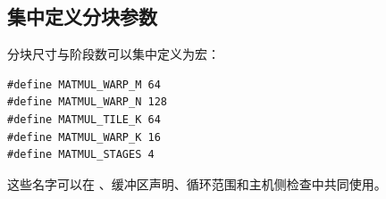 \subsection*{集中定义分块参数}

分块尺寸与阶段数可以集中定义为宏：

\begin{lstlisting}[language=croqtile,caption={用宏表示分块参数}]
#define MATMUL_WARP_M 64
#define MATMUL_WARP_N 128
#define MATMUL_TILE_K 64
#define MATMUL_WARP_K 16
#define MATMUL_STAGES 4
\end{lstlisting}

这些名字可以在 \co@parallel@、缓冲区声明、循环范围和主机侧检查中共同使用。
